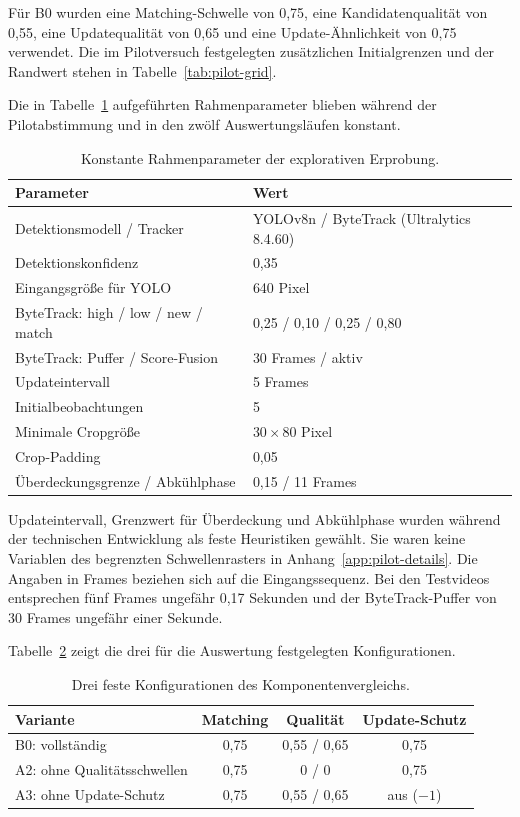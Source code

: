 \documentclass[runningheads,a4paper]{llncs}
\begin{document}
Für B0 wurden eine Matching-Schwelle von 0,75, eine Kandidatenqualität von 0,55, eine Updatequalität von 0,65 und eine Update-Ähnlichkeit von 0,75 verwendet. Die im Pilotversuch festgelegten zusätzlichen Initialgrenzen und der Randwert stehen in Tabelle~\ref{tab:pilot-grid}.

Die in Tabelle~\ref{tab:defaults} aufgeführten Rahmenparameter blieben während der Pilotabstimmung und in den zwölf Auswertungsläufen konstant.

\begin{table}[tbp]
\caption{Konstante Rahmenparameter der explorativen Erprobung.}
\label{tab:defaults}
\centering
\small
\begin{tabularx}{\linewidth}{@{}Xl@{}}
\toprule
Parameter & Wert \\
\midrule
Detektionsmodell / Tracker & YOLOv8n / ByteTrack (Ultralytics 8.4.60) \\
Detektionskonfidenz & 0,35 \\
Eingangsgrö{\ss}e für YOLO & 640 Pixel \\
ByteTrack: high / low / new / match & 0,25 / 0,10 / 0,25 / 0,80 \\
ByteTrack: Puffer / Score-Fusion & 30 Frames / aktiv \\
Updateintervall & 5 Frames \\
Initialbeobachtungen & 5 \\
Minimale Cropgrö{\ss}e & $30\times80$ Pixel \\
Crop-Padding & 0,05 \\
Überdeckungsgrenze / Abkühlphase & 0,15 / 11 Frames \\
\bottomrule
\end{tabularx}
\end{table}

Updateintervall, Grenzwert für Überdeckung und Abkühlphase wurden während der technischen Entwicklung als feste Heuristiken gewählt. Sie waren keine Variablen des begrenzten Schwellenrasters in Anhang~\ref{app:pilot-details}. Die Angaben in Frames beziehen sich auf die Eingangssequenz. Bei den Testvideos entsprechen fünf Frames ungefähr 0,17 Sekunden und der ByteTrack-Puffer von 30 Frames ungefähr einer Sekunde.

Tabelle~\ref{tab:variants} zeigt die drei für die Auswertung festgelegten Konfigurationen.

\begin{table}[tbp]
\caption{Drei feste Konfigurationen des Komponentenvergleichs.}
\label{tab:variants}
\centering
\small
\begin{tabularx}{\linewidth}{@{}Xccc@{}}
\toprule
Variante & Matching & Qualität & Update-Schutz \\
\midrule
B0: vollständig & 0,75 & 0,55 / 0,65 & 0,75 \\
A2: ohne Qualitätsschwellen & 0,75 & 0 / 0 & 0,75 \\
A3: ohne Update-Schutz & 0,75 & 0,55 / 0,65 & aus ($-1$) \\
\bottomrule
\end{tabularx}
\end{table}
\end{document}
